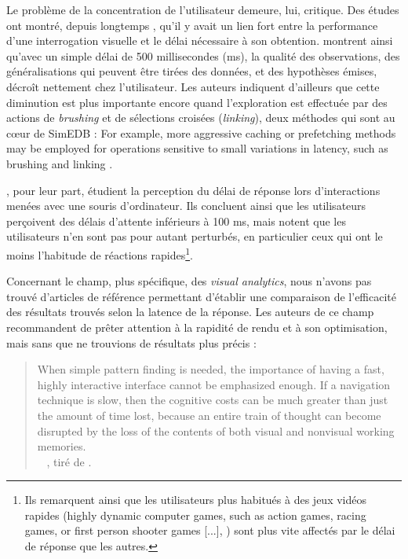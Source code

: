 Le problème de la concentration de l'utilisateur demeure, lui, critique.
Des études ont montré, depuis longtemps \autocite{mackenzie_lag_1993}, qu'il y avait un lien fort entre la performance d'une interrogation visuelle et le délai nécessaire à son obtention.
\cite[8]{liu_effects_2014} montrent ainsi qu'avec un simple délai de 500 millisecondes (ms), la qualité des observations, des généralisations qui peuvent être tirées des données, et des hypothèses émises, décroît nettement chez l'utilisateur.
Les auteurs indiquent d'ailleurs que cette diminution est plus importante encore quand l'exploration est effectuée par des actions de \textit{brushing} et de sélections croisées (\textit{linking}), deux méthodes qui sont au cœur de SimEDB : \og For example, more aggressive caching or prefetching methods may be employed for operations sensitive to small variations in latency, such as brushing and linking \fg{} \autocite[9]{liu_effects_2014}.

\cite{forch_are_2017}, pour leur part, étudient la perception du délai de réponse lors d'interactions menées avec une souris d'ordinateur.
Ils concluent ainsi que les utilisateurs perçoivent des délais d'attente inférieurs à 100 ms, mais notent que les utilisateurs n'en sont pas pour autant perturbés, en particulier ceux qui ont le moins l'habitude de réactions rapides\footnote{
Ils remarquent ainsi que les utilisateurs plus habitués à des jeux vidéos rapides (\og highly dynamic computer games, such as action games, racing games, or first person shooter games [...]\fg{}, \cite[51]{forch_are_2017}) sont plus vite affectés par le délai de réponse que les autres.
}.

Concernant le champ, plus spécifique, des \textit{visual analytics}, nous n'avons pas trouvé d'articles de référence permettant d'établir une comparaison de l'efficacité des résultats trouvés selon la latence de la réponse.
Les auteurs de ce champ recommandent de prêter attention à la rapidité de rendu et à son optimisation, mais sans que ne trouvions de résultats plus précis :
\begin{quotation}
\og
When simple pattern finding is needed, the importance of having a fast, highly interactive interface cannot be emphasized	enough.
If a navigation technique is slow, then the cognitive costs can be much greater than just the amount of time lost, because an entire train of thought can become disrupted by the loss of the contents of both visual and nonvisual working memories.
\fg{}\\
\mbox{}~ \hfill  \cite{ware_information_2012}, tiré de \cite[12]{amirpour_amraii_human-data_2018}.
\end{quotation}


